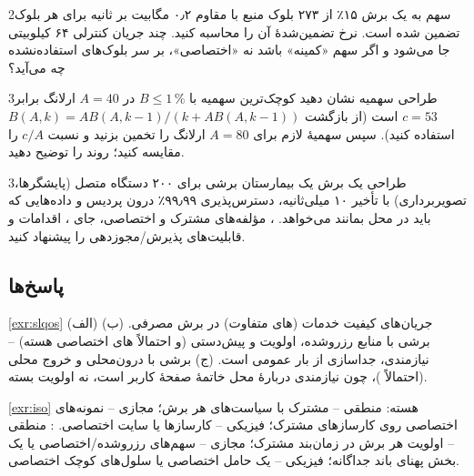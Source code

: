 \documentclass[11pt,a4paper]{article}
\begin{document}
\begin{exercisebox}{2}{سهم }\label{exr:prb}
به یک برش  ۱۵٪ از ۲۷۳ بلوک منبع با  مقاوم ۰٫۲ مگابیت بر ثانیه برای هر بلوک تضمین شده است. نرخ تضمین‌شدهٔ آن را محاسبه
کنید. چند جریان کنترلی ۶۴ کیلوبیتی جا می‌شود و اگر سهم «کمینه» باشد نه «اختصاصی»، بر سر بلوک‌های استفاده‌نشده چه می‌آید؟
\end{exercisebox}

\begin{exercisebox}{3}{طراحی سهمیه}\label{exr:nsac}
نشان دهید کوچک‌ترین سهمیه با $B \le 1\,\%$ در $A = 40$ ارلانگ برابر $c = 53$ است (از بازگشت $B(A,k) = A B(A,k-1)/(k + A B(A,k-1))$ استفاده
کنید). سپس سهمیهٔ لازم برای $A = 80$ ارلانگ را تخمین بزنید و نسبت $c/A$ را مقایسه کنید؛ روند را توضیح دهید.
\end{exercisebox}

\begin{exercisebox}{3}{طراحی یک برش}\label{exr:design}
یک بیمارستان برشی برای ۲۰۰ دستگاه متصل (پایشگرها، تصویربرداری) با تأخیر ۱۰ میلی‌ثانیه، دسترس‌پذیری ۹۹٫۹۹٪ درون پردیس و داده‌هایی که باید در
محل بمانند می‌خواهد. ، مؤلفه‌های مشترک و اختصاصی، جای ، اقدامات  و قابلیت‌های پذیرش/مجوزدهی را پیشنهاد کنید.
\end{exercisebox}

\subsection*{پاسخ‌ها}

\begin{solutionbox}{\ref{exr:slqos}}
(الف) جریان‌های کیفیت خدمات (های متفاوت) در برش مصرفی. (ب) برشی با منابع  رزروشده، اولویت و پیش‌دستی (و احتمالاً های
اختصاصی هسته) -- نیازمندی، جداسازی از بار عمومی است. (ج) برشی با  درون‌محلی و خروج محلی (احتمالاً )، چون نیازمندی دربارهٔ
محل خاتمهٔ صفحهٔ کاربر است، نه اولویت بسته.
\end{solutionbox}

\begin{solutionbox}{\ref{exr:iso}}
هسته: منطقی --  مشترک با سیاست‌های هر برش؛ مجازی -- نمونه‌های اختصاصی  روی کارسازهای مشترک؛ فیزیکی -- کارسازها یا سایت
اختصاصی. : منطقی -- اولویت هر برش در زمان‌بند مشترک؛ مجازی -- سهم‌های  رزروشده/اختصاصی یا یک بخش پهنای باند جداگانه؛ فیزیکی --
یک حامل اختصاصی یا سلول‌های کوچک اختصاصی.
\end{solutionbox}
\end{document}
